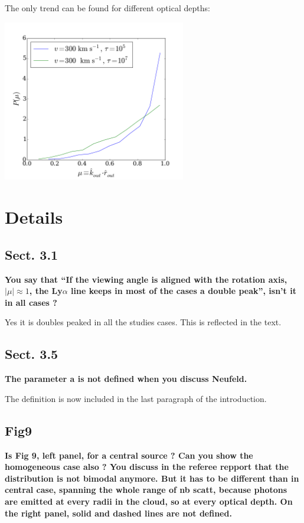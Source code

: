\documentclass[12pt]{article}
\begin{document}
The only trend can be found for different optical depths:

\begin{center}
  \includegraphics[width=0.6\textwidth]{./surface_mu_diff_tau.png}
\end{center}

\section*{Details}

\subsection*{Sect. 3.1}

{\bf You say that “If the viewing angle is aligned with the rotation
  axis, $|\mu| \approx 1$, the Ly$\alpha$ line keeps in most of the
  cases a double peak”, isn’t it in all cases ?} 
  
  Yes it is doubles peaked in all the studies cases. This is reflected
  in the text.

\subsection*{Sect. 3.5}
{\bf The parameter a is not defined when you discuss Neufeld.} 

The definition is now included in the last paragraph of the
introduction. 

\subsection*{Fig9}

{\bf Is Fig 9, left panel, for a central source ? Can you show the
  homogeneous case also ? You discuss in the referee repport that the
  distribution is not bimodal anymore. But it has to be different than
  in central case, spanning the whole range of nb scatt, because
  photons are emitted at every radii in the cloud, so at every optical
  depth. On the right panel, solid and dashed lines are not defined.}
 
\end{document}
